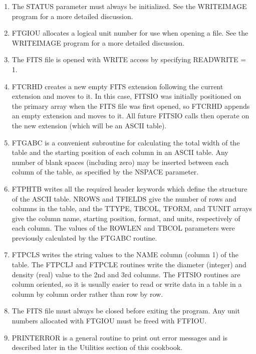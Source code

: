 \begin{enumerate}
\item
The STATUS parameter must always be initialized.  See the WRITEIMAGE 
program for a more detailed discussion.

\item
FTGIOU allocates a logical unit number for use when opening a file.
See the WRITEIMAGE program for a more detailed discussion.

\item
The FITS file is opened with WRITE access by specifying READWRITE = 1.

\item
FTCRHD creates a new empty FITS extension following the current
extension and moves to it.  In this case, FITSIO was initially
positioned on the primary array when the FITS file was first opened, so
FTCRHD appends an empty extension and moves to it.  All future FITSIO
calls then operate on the new extension (which will be an ASCII
table).
\item
FTGABC is a convenient subroutine for calculating the total width of
the table and the starting position of each column in an ASCII table.
Any number of blank spaces (including zero)  may be inserted between
each column of the table, as specified by the NSPACE parameter.
\item
FTPHTB writes all the required header keywords which define the
structure of the ASCII table. NROWS and TFIELDS give the number of
rows and columns in the table, and the TTYPE, TBCOL, TFORM, and TUNIT
arrays give the column name, starting position, format, and units,
respectively of each column. The values of the ROWLEN and TBCOL parameters
were previously calculated by the FTGABC routine.
\item
FTPCLS writes the string values to the NAME column (column 1) of the
table.  The FTPCLJ and FTPCLE routines write the diameter (integer) and
density (real) value to the 2nd and 3rd columns.  The FITSIO routines
are column oriented, so it is usually easier to read or write data in a
table in a column by column order rather than row by row.
\item
The FITS file must always be closed before exiting the program. 
Any unit numbers allocated with FTGIOU must be freed with FTFIOU.
\item
PRINTERROR is a general routine to print out error messages and is
described later in  the Utilities section of this cookbook.
\end{enumerate}

